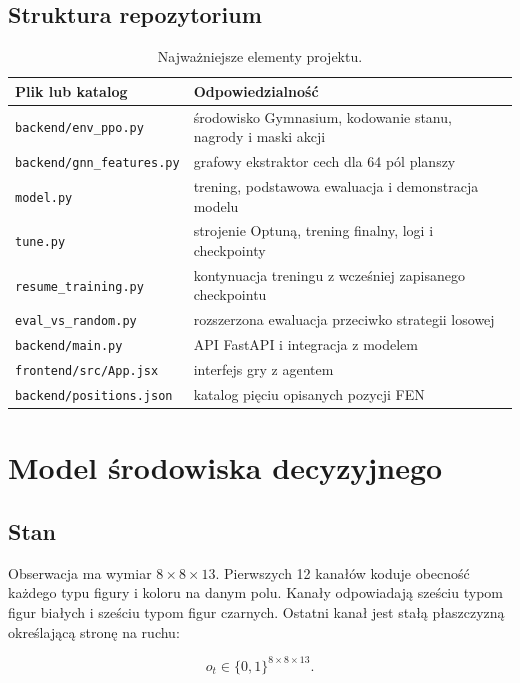 \documentclass[12pt,a4paper]{article}
\newcommand{\code}[1]{\texttt{#1}}
\begin{document}
\subsection{Struktura repozytorium}

\begin{table}[H]
\centering
\caption{Najważniejsze elementy projektu.}
\begin{tabular}{p{}p{}}
\toprule
\textbf{Plik lub katalog} & \textbf{Odpowiedzialność} \\
\midrule
\code{backend/env\_ppo.py} & środowisko Gymnasium, kodowanie stanu, nagrody i maski akcji \\
\code{backend/gnn\_features.py} & grafowy ekstraktor cech dla 64 pól planszy \\
\code{model.py} & trening, podstawowa ewaluacja i demonstracja modelu \\
\code{tune.py} & strojenie Optuną, trening finalny, logi i checkpointy \\
\code{resume\_training.py} & kontynuacja treningu z wcześniej zapisanego checkpointu \\
\code{eval\_vs\_random.py} & rozszerzona ewaluacja przeciwko strategii losowej \\
\code{backend/main.py} & API FastAPI i integracja z modelem \\
\code{frontend/src/App.jsx} & interfejs gry z agentem \\
\code{backend/positions.json} & katalog pięciu opisanych pozycji FEN \\
\bottomrule
\end{tabular}
\end{table}

\section{Model środowiska decyzyjnego}

\subsection{Stan}

Obserwacja ma wymiar $8\times8\times13$. Pierwszych 12 kanałów koduje obecność
każdego typu figury i koloru na danym polu. Kanały odpowiadają sześciu typom
figur białych i sześciu typom figur czarnych. Ostatni kanał jest stałą płaszczyzną
określającą stronę na ruchu:

\[
o_t \in \{0,1\}^{8\times8\times13}.
\]
\end{document}
